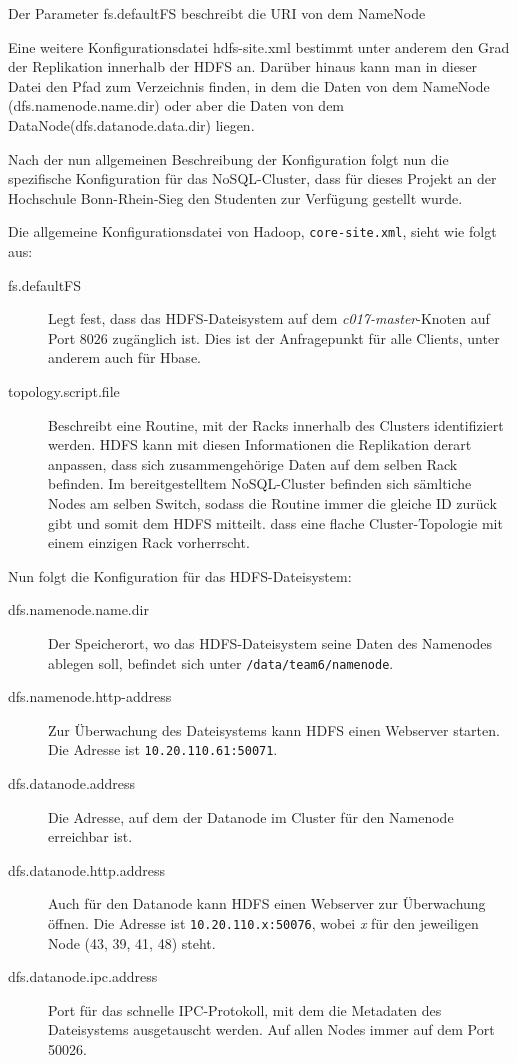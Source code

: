 Der Parameter fs.defaultFS beschreibt die URI von dem NameNode

Eine weitere Konfigurationsdatei hdfs-site.xml bestimmt unter anderem den Grad der Replikation innerhalb der HDFS an.
Darüber hinaus kann man in dieser Datei den Pfad zum Verzeichnis finden, in dem die Daten von dem NameNode (dfs.namenode.name.dir) oder aber die Daten von dem DataNode(dfs.datanode.data.dir) liegen.

Nach der nun allgemeinen Beschreibung der Konfiguration folgt nun die spezifische Konfiguration für das NoSQL-Cluster, dass für
dieses Projekt an der Hochschule Bonn-Rhein-Sieg den Studenten zur Verfügung gestellt wurde.

Die allgemeine Konfigurationsdatei von Hadoop, \texttt{core-site.xml}, sieht wie folgt aus:
\lstset{basicstyle=\small}


\begin{description}
	\item[fs.defaultFS] Legt fest, dass das HDFS-Dateisystem auf dem \textit{c017-master}-Knoten auf Port $8026$ zugänglich ist.
	Dies ist der Anfragepunkt für alle Clients, unter anderem auch für Hbase.
	\item[topology.script.file] Beschreibt eine Routine, mit der Racks innerhalb des Clusters identifiziert werden. HDFS kann mit diesen
	Informationen die Replikation derart anpassen, dass sich zusammengehörige Daten auf dem selben Rack befinden. Im bereitgestelltem
	NoSQL-Cluster befinden sich sämltiche Nodes am selben Switch, sodass die Routine immer die gleiche ID zurück gibt
	und somit dem HDFS mitteilt. dass eine flache Cluster-Topologie mit einem einzigen Rack vorherrscht.
\end{description}

Nun folgt die Konfiguration für das HDFS-Dateisystem:
\lstset{basicstyle=\small}


\begin{description}
	\item[dfs.namenode.name.dir] Der Speicherort, wo das HDFS-Dateisystem seine Daten des Namenodes ablegen soll, befindet sich unter
	\texttt{/data/team6/namenode}.
	\item[dfs.namenode.http-address] Zur Überwachung des Dateisystems kann HDFS einen Webserver starten. Die Adresse ist 
	\texttt{10.20.110.61:50071}.
	\item[dfs.datanode.address] Die Adresse, auf dem der Datanode im Cluster für den Namenode erreichbar ist.
	\item[dfs.datanode.http.address] Auch für den Datanode kann HDFS einen Webserver zur Überwachung öffnen. Die Adresse ist
	\texttt{10.20.110.x:50076}, wobei \textit{x} für den jeweiligen Node (43, 39, 41, 48) steht.
	\item[dfs.datanode.ipc.address] Port für das schnelle IPC-Protokoll, mit dem die Metadaten des Dateisystems ausgetauscht werden.
	Auf allen Nodes immer auf dem Port 50026.
\end{description}

